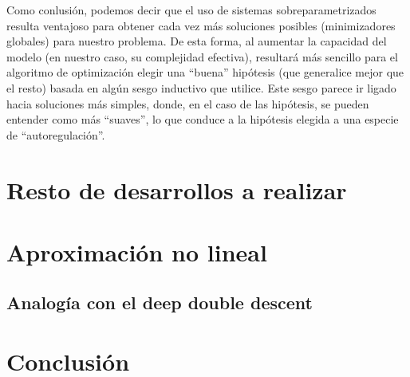 Como conlusión, podemos decir que el uso de sistemas sobreparametrizados resulta ventajoso para obtener cada vez más soluciones posibles (minimizadores globales) para nuestro problema. De esta forma, al aumentar la capacidad del modelo (en nuestro caso, su complejidad efectiva), resultará más sencillo para el algoritmo de optimización elegir una ``buena'' hipótesis (que generalice mejor que el resto) basada en algún sesgo inductivo que utilice. Este sesgo parece ir ligado hacia soluciones más simples, donde, en el caso de las hipótesis, se pueden entender como más ``suaves'', lo que conduce a la hipótesis elegida a una especie de ``autoregulación''.\newline

\section{Resto de desarrollos a realizar}\label{}

\section{Aproximación no lineal}\label{sec:aproximacion-no-lineal}

\subsection{Analogía con el deep double descent}

\section{Conclusión}\label{sec:conclusion-matematica}

